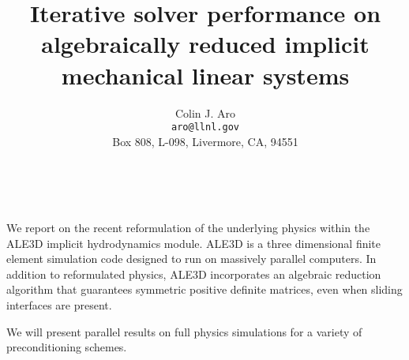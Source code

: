 \documentclass[11pt]{article}
\date{ ~ \hspace{-4mm}}
\title{Iterative solver performance on algebraically reduced implicit mechanical linear systems  }
\author{Colin J. Aro \\ {\tt  aro@llnl.gov} \\ Box 808, L-098, Livermore, CA, 94551}
\begin{document}
\maketitle
\thispagestyle{empty}





 



We report on the recent reformulation of the underlying
physics within the ALE3D implicit hydrodynamics module.
ALE3D is a three dimensional finite element simulation
code designed to run on massively parallel computers.
In addition to reformulated physics, ALE3D incorporates
an algebraic reduction algorithm that guarantees symmetric
positive definite matrices, even when sliding interfaces
are present.

We will present parallel results on full physics simulations
for a variety of preconditioning schemes.
\end{document}
